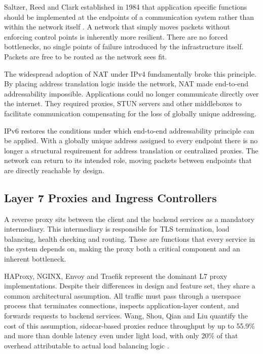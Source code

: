 \documentclass[a4paper,11pt]{article}
\begin{document}
Saltzer, Reed and Clark established in 1984 that application specific functions should be
implemented at the endpoints of a communication system rather than within the network itself \cite{saltzerEndtoendArgumentsSystem1984}.
A network that simply moves packets without enforcing control points is inherently more resilient. There are no forced
bottlenecks, no single points of failure introduced by the infrastructure itself. Packets are free to be
routed as the network sees fit.

The widespread adoption of NAT under IPv4 fundamentally broke this principle. By placing address translation logic
inside the network, NAT made end-to-end addressability impossible. Applications could no longer communicate directly over the internet.
They required proxies, STUN servers and other middleboxes to facilitate communication compensating for the loss of
globally unique addressing.

IPv6 restores the conditions under which end-to-end addressability principle can be applied. With a globally unique address assigned to
every endpoint there is no longer a structural requirement for address translation or centralized proxies. The network can return to its intended role,
moving packets between endpoints that are directly reachable by design.

\subsection{Layer 7 Proxies and Ingress Controllers}

A reverse proxy sits between the client and the backend services as a mandatory intermediary.
This intermediary is responsible for TLS termination, load balancing, health checking and routing.
These are functions that every service in the system depends on, making the proxy both a critical component and an
inherent bottleneck.

HAProxy, NGINX, Envoy and Traefik represent the dominant L7 proxy implementations.
Despite their differences in design and feature set, they share a common architectural assumption.
All traffic must pass through a userspace process that terminates connections,
inspects application-layer content,
and forwards requests to backend services.
Wang, Shou, Qian and Liu quantify the cost of this assumption,
sidecar-based proxies reduce throughput by up to 55.9\% and more than double latency even under light load,
with only 20\% of that overhead attributable to actual load balancing logic \cite{wangXLBHighPerformance2026}.
\end{document}
